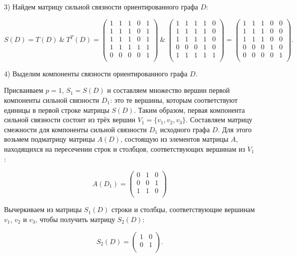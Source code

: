 \documentclass[fleqn]{article}
\begin{document}
3) Найдем матрицу сильной связности ориентированного графа $D$:

$$S(D)= T(D) \:\&\: T^T(D)=
\begin{pmatrix}
1 & 1 & 1 & 0 & 1\\
1 & 1 & 1 & 0 & 1\\
1 & 1 & 1 & 0 & 1\\
1 & 1 & 1 & 1 & 1\\
0 & 0 & 0 & 0 & 1\\
\end{pmatrix}
\:\&\:
\begin{pmatrix}
1 & 1 & 1 & 1 & 0\\
1 & 1 & 1 & 1 & 0\\
1 & 1 & 1 & 1 & 0\\
0 & 0 & 0 & 1 & 0\\
1 & 1 & 1 & 1 & 1\\
\end{pmatrix}
=\begin{pmatrix}
1 & 1 & 1 & 0 & 0 \\
1 & 1 & 1 & 0 & 0 \\
1 & 1 & 1 & 0 & 0 \\
0 & 0 & 0 & 1 & 0 \\
0 & 0 & 0 & 0 & 1 \\
\end{pmatrix}.
$$

4) Выделим компоненты связности ориентированного графа $D$.

Присваиваем $p=1$, $S_1 = S(D)$ и составляем множество вершин
первой компоненты сильной связности $D_1$: это те вершины, которым соответствуют единицы в первой строке матрицы $S(D)$. Таким образом, первая компонента сильной связности состоит из трёх вершин $V_1=\{v_1, v_2, v_3\}$. Составляем матрицу смежности для компоненты сильной связности $D_1$ исходного графа $D$. Для этого возьмем подматрицу матрицы $A(D)$, состоящую из элементов матрицы $A$, находящихся на пересечении строк и столбцов, соответствующих вершинам из $V_1$:

$$A(D_1)=
\begin{pmatrix}
0 & 1 & 0 \\
0 & 0 & 1 \\
1 & 1 & 0 \\
\end{pmatrix}
$$

Вычеркиваем из матрицы $S_1(D)$ строки и столбцы,
соответствующие вершинам $v_1$, $v_2$ и $v_3$, чтобы получить матрицу $S_2(D)$:

$$S_2(D)=
\begin{pmatrix}
1 & 0 \\
0 & 1 \\
\end{pmatrix}.
$$
\end{document}

